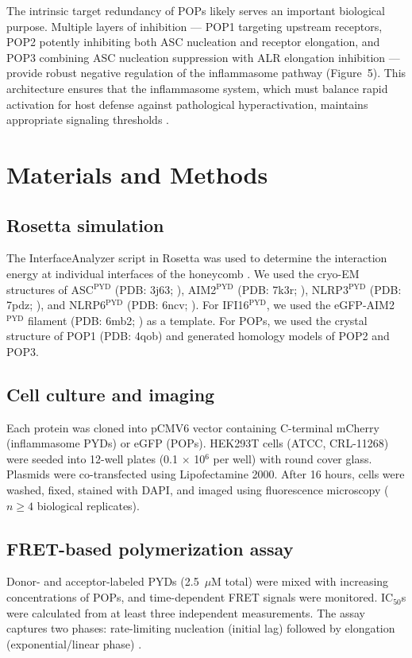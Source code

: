 \documentclass[11pt]{article}
\begin{document}
The intrinsic target redundancy of POPs likely serves an important biological purpose. Multiple layers of inhibition --- POP1 targeting upstream receptors, POP2 potently inhibiting both ASC nucleation and receptor elongation, and POP3 combining ASC nucleation suppression with ALR elongation inhibition --- provide robust negative regulation of the inflammasome pathway (Figure~5). This architecture ensures that the inflammasome system, which must balance rapid activation for host defense against pathological hyperactivation, maintains appropriate signaling thresholds \citep{broz2016,kagan2014,indramohan2018}.

\section{Materials and Methods}

\subsection{Rosetta simulation}
The InterfaceAnalyzer script in Rosetta was used to determine the interaction energy at individual interfaces of the honeycomb \citep{matyszewski2021}. We used the cryo-EM structures of ASC$^{\text{PYD}}$ (PDB: 3j63; \citealt{lu2014}), AIM2$^{\text{PYD}}$ (PDB: 7k3r; \citealt{matyszewski2021}), NLRP3$^{\text{PYD}}$ (PDB: 7pdz; \citealt{hochheiser2022a}), and NLRP6$^{\text{PYD}}$ (PDB: 6ncv; \citealt{shen2019}). For IFI16$^{\text{PYD}}$, we used the eGFP-AIM2$^{\text{PYD}}$ filament (PDB: 6mb2; \citealt{lu2015}) as a template. For POPs, we used the crystal structure of POP1 (PDB: 4qob) and generated homology models of POP2 and POP3.

\subsection{Cell culture and imaging}
Each protein was cloned into pCMV6 vector containing C-terminal mCherry (inflammasome PYDs) or eGFP (POPs). HEK293T cells (ATCC, CRL-11268) were seeded into 12-well plates (0.1 $\times$ 10$^6$ per well) with round cover glass. Plasmids were co-transfected using Lipofectamine 2000. After 16 hours, cells were washed, fixed, stained with DAPI, and imaged using fluorescence microscopy ($n \geq 4$ biological replicates).

\subsection{FRET-based polymerization assay}
Donor- and acceptor-labeled PYDs (2.5~$\mu$M total) were mixed with increasing concentrations of POPs, and time-dependent FRET signals were monitored. IC$_{50}$s were calculated from at least three independent measurements. The assay captures two phases: rate-limiting nucleation (initial lag) followed by elongation (exponential/linear phase) \citep{matyszewski2018}.
\end{document}

